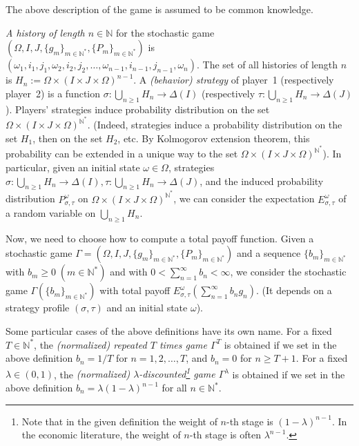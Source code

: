 \documentclass[english,openary,12pt]{article}
\theoremstyle{definition}
\newcommand{\N}{\mathbb{N}}
\begin{document}
The above description of the game is assumed to be common knowledge.

\emph{A history of length $n \in \N$} for the stochastic game 
$(\Omega, I, J, \{g_m\}_{m\in\N^*}, \{P_m\}_{m\in\N^*})$ is\\
$(\omega_1, i_1, j_1, \omega_2, i_2, j_2, \ldots, \omega_{n-1}, i_{n-1}, j_{n-1}, \omega_n)$.
The set of all histories of length $n$ is 
$H_n := \Omega \times (I \times J \times \Omega)^{n-1}$.
A \emph{(behavior) strategy} of player~1 (respectively player~2) is a function 
$\sigma : \bigcup_{n \ge 1} H_n \to \Delta(I)$ 
(respectively $\tau : \bigcup_{n \ge 1} H_n \to \Delta(J)$). 
Players' strategies induce probability distribution on the set 
$\Omega \times (I \times J \times \Omega)^{\N^*}$. 
(Indeed, strategies induce a probability distribution on the set $H_1$, 
then on the set $H_2$, etc. By Kolmogorov extension theorem, 
this probability can be extended in a unique way to the set 
$\Omega \times (I \times J \times \Omega)^{\N^*}$). 
In particular, given an initial state $\omega \in \Omega$, 
strategies $\sigma : \bigcup_{n \ge 1} H_n \to \Delta(I), 
\tau : \bigcup_{n \ge 1} H_n \to \Delta(J)$, and the induced probability 
distribution $P^\omega_{\sigma, \tau}$ on $\Omega \times 
(I \times J \times \Omega)^{\N^*}$, we can consider the expectation 
$E^\omega_{\sigma, \tau}$ of a random variable on $\bigcup_{n \ge 1} H_n$.

Now, we need to choose how to compute a total payoff function. Given a stochastic game
$\Gamma = (\Omega, I, J, \{g_m\}_{m\in\N^*}, \{P_m\}_{m\in\N^*})$ 
and a sequence $\{b_m\}_{m \in \N^*}$ with $b_m \ge 0 \; (m \in \N^*)$ and with $0 < \sum_{n=1}^\infty b_n < \infty$, we consider the stochastic game $\Gamma(\{b_m\}_{m \in \N^*})$ 
with total payoff
$E^\omega_{\sigma, \tau} \left(\sum_{n=1}^\infty b_n g_n\right).$
(It depends on a strategy profile $(\sigma, \tau)$ and an initial state $\omega$).

Some particular cases of the above definitions have its own name. For a fixed 
$T \in \N^*$, the \emph{(normalized) repeated $T$ times game $\Gamma^T$} is obtained 
if we set in the above definition
$b_n = 1/T$ for $n = 1, 2, \ldots, T$, and $b_n = 0$ for $n \ge T+1$.
For a fixed $\lambda \in (0,1)$, the 
\emph{(normalized) $\lambda$-discounted\footnote{Note that in the given definition the weight of $n$-th stage is $(1-\lambda)^{n-1}$. In the economic literature, the weight of $n$-th stage is often $\lambda^{n-1}$.} 
game 
$\Gamma^\lambda$} is obtained if we set in the above definition
$b_n = \lambda (1-\lambda)^{n-1}$ for all $n \in \N^*$.
\end{document}
